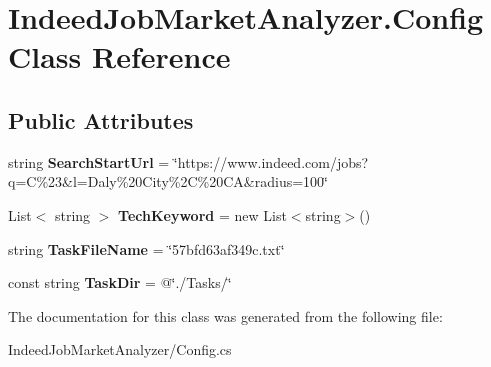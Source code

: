 \hypertarget{class_indeed_job_market_analyzer_1_1_config}{}\section{Indeed\+Job\+Market\+Analyzer.\+Config Class Reference}
\label{class_indeed_job_market_analyzer_1_1_config}
\subsection*{Public Attributes}
\begin{DoxyCompactItemize}
\item 
\hypertarget{class_indeed_job_market_analyzer_1_1_config_a25523eacf932f21f240b2f1352f921f7}{}string {\bfseries Search\+Start\+Url} = \char`\"{}https\+://www.\+indeed.\+com/jobs?q=C\%23\&l=Daly\%20\+City\%2\+C\%20\+C\+A\&radius=100\char`\"{}\label{class_indeed_job_market_analyzer_1_1_config_a25523eacf932f21f240b2f1352f921f7}

\item 
\hypertarget{class_indeed_job_market_analyzer_1_1_config_a8dd20d9aae520cca773d796af245251c}{}List$<$ string $>$ {\bfseries Tech\+Keyword} = new List$<$string$>$()\label{class_indeed_job_market_analyzer_1_1_config_a8dd20d9aae520cca773d796af245251c}

\item 
\hypertarget{class_indeed_job_market_analyzer_1_1_config_a9187e6a451bbd59c237e93853908557c}{}string {\bfseries Task\+File\+Name} = \char`\"{}57bfd63af349c.\+txt\char`\"{}\label{class_indeed_job_market_analyzer_1_1_config_a9187e6a451bbd59c237e93853908557c}

\item 
\hypertarget{class_indeed_job_market_analyzer_1_1_config_a89adbade86b707fb9c7d3be10ecae354}{}const string {\bfseries Task\+Dir} = @\char`\"{}./Tasks/\char`\"{}\label{class_indeed_job_market_analyzer_1_1_config_a89adbade86b707fb9c7d3be10ecae354}

\end{DoxyCompactItemize}


The documentation for this class was generated from the following file\+:\begin{DoxyCompactItemize}
\item 
Indeed\+Job\+Market\+Analyzer/Config.\+cs\end{DoxyCompactItemize}

